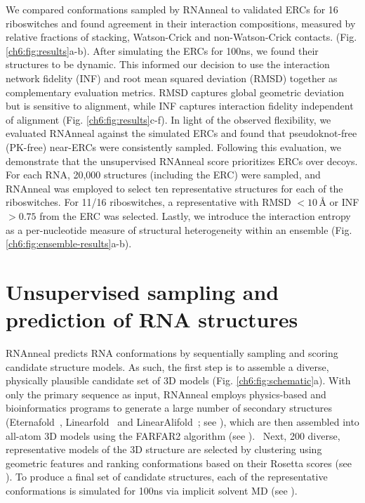 We compared conformations sampled by RNAnneal to validated ERCs for 16 riboswitches and found agreement in their interaction compositions, measured by relative fractions of stacking, Watson-Crick and non-Watson-Crick contacts. (Fig. \ref{ch6:fig:results}a-b). After simulating the ERCs for 100ns, we found their structures to be dynamic. This informed our decision to use the interaction network fidelity (INF) and root mean squared deviation (RMSD) together as complementary evaluation metrics. RMSD captures global geometric deviation but is sensitive to alignment, while INF captures interaction fidelity independent of alignment (Fig. \ref{ch6:fig:results}c-f). In light of the observed flexibility, we evaluated RNAnneal against the simulated ERCs and found that pseudoknot-free (PK-free) near-ERCs were consistently sampled. Following this evaluation, we demonstrate that the unsupervised RNAnneal score prioritizes ERCs over decoys. For each RNA, 20,000 structures (including the ERC) were sampled, and RNAnneal was employed to select ten representative structures for each of the riboswitches. For 11/16 riboswitches, a representative with RMSD $<10\,\text{\AA}$ or INF $>0.75$ from the ERC was selected. Lastly, we introduce the interaction entropy as a per-nucleotide measure of structural heterogeneity within an ensemble (Fig. \ref{ch6:fig:ensemble-results}a-b).

\section{Unsupervised sampling and prediction of RNA structures}
RNAnneal predicts RNA conformations by sequentially sampling and scoring candidate structure models. As such, the first step is to assemble a diverse, physically plausible candidate set of 3D models (Fig. \ref{ch6:fig:schematic}a). With only the primary sequence as input, RNAnneal employs physics-based and bioinformatics programs to generate a large number of secondary structures (Eternafold~\cite{wayment2022rna}, Linearfold~\cite{huang2019linearfold} and LinearAlifold~\cite{malik2024linearalifold}; see ), which are then assembled into all-atom 3D models using the FARFAR2 algorithm (see ).~\cite{huang2019linearfold,wayment2022rna,malik2024linearalifold,watkins2020farfar2} Next, 200 diverse, representative models of the 3D structure are selected by clustering using geometric features and ranking conformations based on their Rosetta scores (see  ). To produce a final set of candidate structures, each of the representative conformations is simulated for 100ns via implicit solvent MD (see ).

